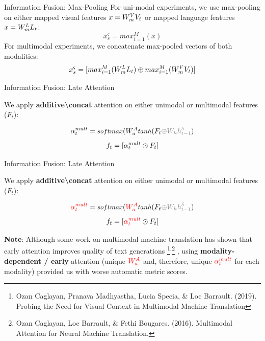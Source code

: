 \documentclass[notes=hide]{beamer}
\begin{document}
\begin{frame}{Information Fusion: Max-Pooling}
For uni-modal experiments, we use max-pooling on either mapped visual features $x=W_{m}\sp{V} V_t$ or mapped language features $x=W_{m}\sp{L} L_t$:
\begin{equation}
x^\varsigma_s = max_{i=1}^M(x)
\end{equation}
\pause
For multimodal experiments, we concatenate max-pooled vectors of both modalities:
\begin{equation}
x^\varsigma_s = [max_{i=1}^M(W_{m}\sp{L} L_t) \oplus max_{i=1}^M(W_{m}\sp{V} V_t)]
\end{equation}
\end{frame}

\begin{frame}{Information Fusion: Late Attention}

We apply \textbf{additive\textbackslash concat} attention on either unimodal or multimodal features ($F_t$):

\begin{equation}
\alpha_t\sp{mult} = \text{\small $softmax$}(W_a\sp{A} \text{\small $tanh$} (F_t\textcolor{gray}{\oplus W_h h\sp{\delta}_{t-1}})
\end{equation}
\begin{equation}
	f_t = [\alpha_t\sp{mult} \odot F_t ]
\end{equation}
\end{frame}

\begin{frame}{Information Fusion: Late Attention}
\small

We apply \textbf{additive\textbackslash concat} attention on either unimodal or multimodal features ($F_t$):

\begin{equation}
\textcolor{red}{ \alpha_t\sp{mult}} = \text{\small $softmax$}( \textcolor{red}{W_a\sp{A}} \text{\small $tanh$} (F_t\textcolor{gray}{\oplus W_h h\sp{\delta}_{t-1}})
\end{equation}
\begin{equation}
	f_t = [ \textcolor{red}{\alpha_t\sp{mult}} \odot F_t ]
\end{equation}

{\vspace{.5cm}\textbf{Note}: Although some work on multimodal machine translation has shown that early attention improves quality of text generations
\footnote{Ozan Caglayan, Pranava Madhyastha, Lucia Specia, \& Loc Barrault. (2019). Probing the Need for Visual Context in Multimodal Machine Translation}$^{,}$\footnote{Ozan Caglayan, Loc Barrault, \& Fethi Bougares. (2016). Multimodal Attention for Neural Machine Translation.}
, using \textbf{modality-dependent / early} attention (unique $\textcolor{red}{W_a\sp{A}}$ and, therefore, unique $\textcolor{red}{ \alpha_t\sp{mult}}$ for each modality) provided us with worse automatic metric scores.}

\end{frame}
\end{document}
